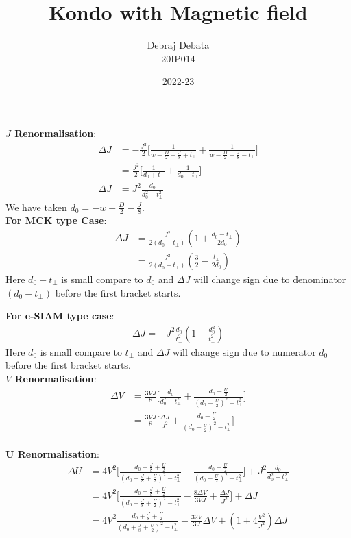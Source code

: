 \documentclass[12pt]{article}
\title{Kondo with Magnetic field}
\author{Debraj Debata\\[1ex] 
\small 20IP014}
\date{ 2022-23}
\begin{document}
\textbf{$J$ Renormalisation}:
\begin{align*}
\Delta J & = - \frac{J^2}{2}\Big[\frac{1}{w-\frac{D}{2} + \frac{J}{8} + t_{\perp}} + \frac{1}{w-\frac{D}{2} + \frac{J}{8} - t_{\perp}} \Big] \\ 
& =  \frac{J^2}{2}\Big[\frac{1}{d_0 + t_{\perp}} + \frac{1}{d_0 - t_{\perp}} \Big] \\
\Delta J & = J^2 \frac{d_0}{d_0^2 - t_{\perp}^2}
\end{align*}
We have taken $d_0 = -w +\frac{D}{2} -\frac{J}{8}$.\\
\textbf{For MCK type Case}:
\begin{align*}
\Delta J & = \frac{J^2}{2 (d_0 - t_{\perp})}(1 + \frac{d_0 - t_{\perp}}{2d_0}) \\
& = \frac{J^2}{2 (d_0 - t_{\perp})}(\frac{3}{2} - \frac{t_{\perp}}{2d_0})
\end{align*}
Here $d_0 - t_{\perp}$ is small compare to $d_0$ and $\Delta J$ will change sign due to denominator $(d_0 - t_{\perp})$ before the first bracket starts.

\textbf{For e-SIAM type case}:
\begin{align*}
\Delta J = - J^2 \frac{d_0}{t_{\perp}^2} (1 + \frac{d_0^2}{t_{\perp}^2})
\end{align*}
Here $d_0$ is small compare to $t_{\perp}$ and $\Delta J$ will change sign due to numerator $d_0$ before the first bracket starts.\\
\textbf{$V$ Renormalisation}:
\begin{align*}
\Delta V & = \frac{3VJ}{8} \Big[\frac{d_0}{d_0^2 - t_{\perp}^2} + \frac{d_0 - \frac{U}{2}}{(d_0 - \frac{U}{2})^2 - t_{\perp}^2} \Big] \\
& = \frac{3VJ}{8} \Big[\frac{\Delta J}{J^2} + \frac{d_0 - \frac{U}{2}}{(d_0 - \frac{U}{2})^2 - t_{\perp}^2} \Big]
\end{align*}\\
\textbf{U Renormalisation}:
\begin{align*}
\Delta U & = 4 V^2 \Big[\frac{d_0 + \frac{J}{8} + \frac{U}{2}}{(d_0 + \frac{J}{8} + \frac{U}{2})^2 - t_{\perp}^2}  -\frac{d_0 - \frac{U}{2}}{(d_0 - \frac{U}{2})^2 - t_{\perp}^2} \Big] + J^2 \frac{d_0}{d_0^2 - t_{\perp}^2} \\
& =  4 V^2 \Big[\frac{d_0 + \frac{J}{8} + \frac{U}{2}}{(d_0 + \frac{J}{8} + \frac{U}{2})^2 - t_{\perp}^2}  -\frac{8 \Delta V}{3VJ} + \frac{\Delta J}{J^2} \Big] + \Delta J \\
& = 4 V^2 \frac{d_0 + \frac{J}{8} + \frac{U}{2}}{(d_0 + \frac{J}{8} + \frac{U}{2})^2 - t_{\perp}^2} - \frac{32 V}{3J} \Delta V + (1 + 4 \frac{V^2}{J^2} )\Delta J
\end{align*}
\end{document}
